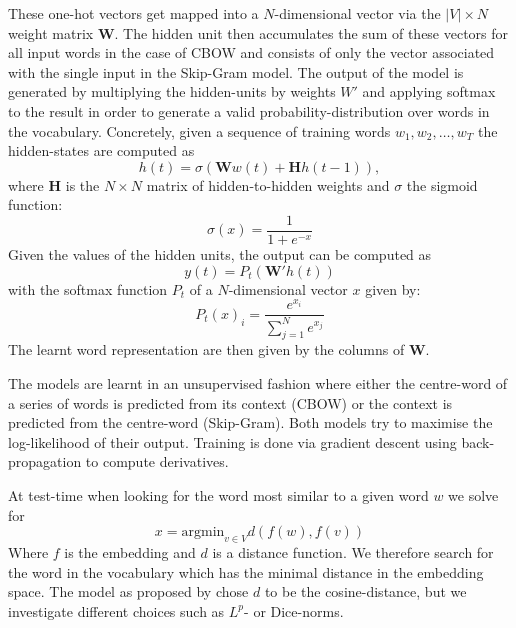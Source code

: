 \documentclass[conference]{IEEEtran}
\begin{document}
These one-hot vectors get mapped into a $N$-dimensional vector via the $|V| \times N$ weight matrix
$\boldsymbol{W}$.  The hidden unit then accumulates the sum of these vectors for all input
words in the case of CBOW and consists of only the vector associated with the single input in the 
Skip-Gram model. The output of the model is generated by multiplying the hidden-units by
weights $W'$ and applying softmax to the result in order to generate a valid
probability-distribution over words in the vocabulary. Concretely, given a sequence of 
training words $w_1, w_2, \dots , w_T$ the hidden-states are computed as
\begin{equation}
	h(t) = \sigma (\boldsymbol{W}w(t) + \boldsymbol{H}h(t-1)),
\end{equation}
where $\boldsymbol{H}$ is the $N \times N$ matrix of hidden-to-hidden weights and 
$\sigma$ the sigmoid function:  
\begin{equation}
	\sigma (x) = \frac{1}{1+e^{-x}} 
\end{equation}
Given the values of the hidden units, the output can be computed as
\begin{equation}
	y(t) = P_t(\boldsymbol{W'}h(t))
\end{equation}
with the softmax function $P_t$ of a $N$-dimensional vector $x$ given by: 
\begin{equation}
	P_t(x)_i = \frac{e^{x_i}}{\sum_{j=1}^{N}{e^{x_j}}}
\end{equation}
The learnt word representation are then given by the columns of $\boldsymbol{W}$.

The models are learnt in an unsupervised fashion where either the centre-word of
a series of words is predicted from its context (CBOW) or the context is
predicted from the centre-word (Skip-Gram). Both models try to maximise the
log-likelihood of their output. Training is done via gradient descent using back-propagation
\cite{rumelhart1988learning} to compute derivatives.

At test-time when looking for the word most similar to a given word $w$ we solve for 
\begin{equation}
	x = \text{argmin}_{v \in V} d(f(w),f(v))
\end{equation}
Where $f$ is the embedding and $d$ is a distance function. We therefore search for the 
word in the vocabulary which has the minimal distance in the embedding space. The 
model as proposed by \cite{mikolov2013efficient} chose $d$ to be the cosine-distance, 
but we investigate different choices such as $L^p$- or Dice-norms.
\end{document}
